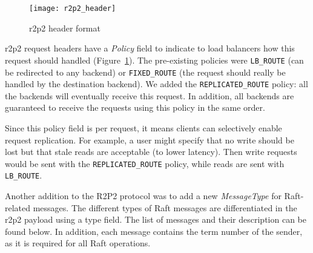 \begin{figure}
    \centering
    \texttt{[image: r2p2\_header]}
    \caption{\gls{r2p2} header format\cite{r2p2}}
    \label{fig:r2p2-header}
\end{figure}


\Gls{r2p2} request headers have a \emph{Policy} field to indicate to load balancers how this request should handled (Figure~\ref{fig:r2p2-header}).
The pre-existing policies were \texttt{LB\_ROUTE} (can be redirected to any backend) or \texttt{FIXED\_ROUTE} (the request should really be handled by the destination backend).
We added the \texttt{REPLICATED\_ROUTE} policy: all the backends will eventually receive this request.
In addition, all backends are guaranteed to receive the requests using this policy in the same order.

Since this policy field is per request, it means clients can selectively enable request replication.
For example, a user might specify that no write should be lost but that stale reads are acceptable (to lower latency).
Then write requests would be sent with the \texttt{REPLICATED\_ROUTE} policy, while reads are sent with \texttt{LB\_ROUTE}.

Another addition to the R2P2 protocol was to add a new \emph{MessageType} for Raft-related messages.
The different types of Raft messages are differentiated in the \gls{r2p2} payload using a type field.
The list of messages and their description can be found below.
In addition, each message contains the term number of the sender, as it is required for all Raft operations.

